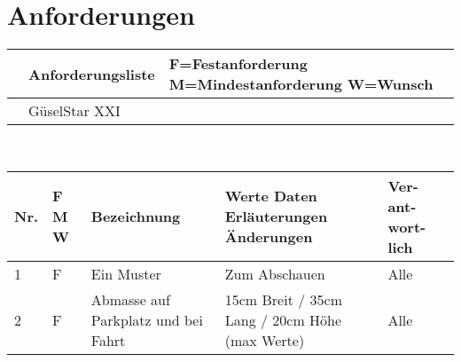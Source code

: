 \section{Anforderungen}
\begin{center}
\begin{tabular}{|p{4cm}|p{6cm}|p{4cm}|}\hline
     &   \huge{Anforderungsliste} & F=Festanforderung M=Mindestanforderung W=Wunsch \\\hline
     &   GüselStar XXI            &  \\\hline
\end{tabular}\\[0.5cm]
\begin{tabular}{|p{1cm}|p{0.5cm}|p{5cm}|p{5cm}|p{1.5cm}|}\hline
\textbf{Nr.} & \textbf{F M W} & \textbf{Bezeichnung} & \textbf{Werte Daten Erläuterungen Änderungen} & \textbf{Ver- ant- wort- lich}\\\hline
1 & F & Ein Muster & Zum Abschauen & Alle\\\hline
2 & F & Abmasse auf Parkplatz und bei Fahrt & 15cm Breit / 35cm Lang / 20cm Höhe (max Werte) & Alle \\\hline

\end{tabular}
\end{center}
